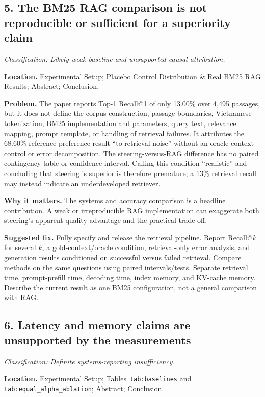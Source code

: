 \documentclass[11pt]{article}
\newcommand{\findinglabel}[1]{\textbf{#1}}
\newcommand{\classification}[1]{\textit{Classification: #1.}}
\begin{document}
\subsection*{5. The BM25 RAG comparison is not reproducible or sufficient for a superiority claim}

\classification{Likely weak baseline and unsupported causal attribution}

\findinglabel{Location.} Experimental Setup; Placebo Control Distribution \& Real BM25 RAG Results; Abstract; Conclusion.

\findinglabel{Problem.} The paper reports Top-1 Recall@1 of only 13.00\% over 4,495 passages, but it does not define the corpus construction, passage boundaries, Vietnamese tokenization, BM25 implementation and parameters, query text, relevance mapping, prompt template, or handling of retrieval failures.  It attributes the 68.60\% reference-preference result ``to retrieval noise'' without an oracle-context control or error decomposition.  The steering-versus-RAG difference has no paired contingency table or confidence interval.  Calling this condition ``realistic'' and concluding that steering is superior is therefore premature; a 13\% retrieval recall may instead indicate an underdeveloped retriever.

\findinglabel{Why it matters.} The systems and accuracy comparison is a headline contribution.  A weak or irreproducible RAG implementation can exaggerate both steering's apparent quality advantage and the practical trade-off.

\findinglabel{Suggested fix.} Fully specify and release the retrieval pipeline.  Report Recall@$k$ for several $k$, a gold-context/oracle condition, retrieval-only error analysis, and generation results conditioned on successful versus failed retrieval.  Compare methods on the same questions using paired intervals/tests.  Separate retrieval time, prompt-prefill time, decoding time, index memory, and KV-cache memory.  Describe the current result as one BM25 configuration, not a general comparison with RAG.

\subsection*{6. Latency and memory claims are unsupported by the measurements}

\classification{Definite systems-reporting insufficiency}

\findinglabel{Location.} Experimental Setup; Tables~\texttt{tab:baselines} and \texttt{tab:equal\_alpha\_ablation}; Abstract; Conclusion.
\end{document}
